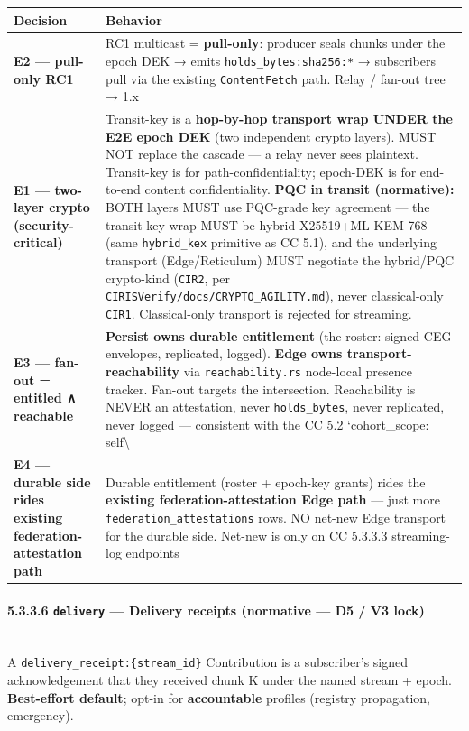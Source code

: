 \documentclass[11pt]{article}
\begin{document}
{\footnotesize
\begin{longtable}{|p{8.0cm}|p{8.0cm}|}\hline
\textbf{Decision} & \textbf{Behavior} \\ \hline\endhead
\textbf{E2 — pull-only RC1} & RC1 multicast = \textbf{pull-only}: producer seals chunks under the epoch DEK → emits \texttt{holds\_bytes:sha256:*} → subscribers pull via the existing \texttt{ContentFetch} path. Relay / fan-out tree → 1.x \\ \hline
\textbf{E1 — two-layer crypto (security-critical)} & Transit-key is a \textbf{hop-by-hop transport wrap UNDER the E2E epoch DEK} (two independent crypto layers). MUST NOT replace the cascade — a relay never sees plaintext. Transit-key is for path-confidentiality; epoch-DEK is for end-to-end content confidentiality. \textbf{PQC in transit (normative):} BOTH layers MUST use PQC-grade key agreement — the transit-key wrap MUST be hybrid X25519+ML-KEM-768 (same \texttt{hybrid\_kex} primitive as CC 5.1), and the underlying transport (Edge/Reticulum) MUST negotiate the hybrid/PQC crypto-kind (\texttt{CIR2}, per \texttt{CIRISVerify/docs/CRYPTO\_AGILITY.md}), never classical-only \texttt{CIR1}. Classical-only transport is rejected for streaming. \\ \hline
\textbf{E3 — fan-out = entitled ∧ reachable} & \textbf{Persist owns durable entitlement} (the roster: signed CEG envelopes, replicated, logged). \textbf{Edge owns transport-reachability} via \texttt{reachability.rs} node-local presence tracker. Fan-out targets the intersection. Reachability is NEVER an attestation, never \texttt{holds\_bytes}, never replicated, never logged — consistent with the CC 5.2 `cohort\_scope: self\textbackslash{} \\ \hline
\textbf{E4 — durable side rides existing federation-attestation path} & Durable entitlement (roster + epoch-key grants) rides the \textbf{existing federation-attestation Edge path} — just more \texttt{federation\_attestations} rows. NO net-new Edge transport for the durable side. Net-new is only on CC 5.3.3.3 streaming-log endpoints \\ \hline
\end{longtable}}


\paragraph{5.3.3.6 \texttt{delivery} — Delivery receipts (normative — D5 / V3 lock)}\mbox{}\\


A \texttt{delivery\_receipt:\{stream\_id\}} Contribution is a subscriber's signed acknowledgement that they received chunk K under the named stream + epoch. \textbf{Best-effort default}; opt-in for \textbf{accountable} profiles (registry propagation, emergency).
\end{document}

